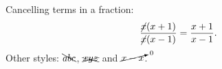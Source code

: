 \documentclass{article}
\begin{document}
Cancelling terms in a fraction:
\[
  \frac{\cancel{x}(x+1)}{\cancel{x}(x-1)} = \frac{x+1}{x-1}.
\]
Other styles: $\bcancel{abc}$, $\xcancel{xyz}$ and $\cancelto{0}{x-x}$.
\end{document}
